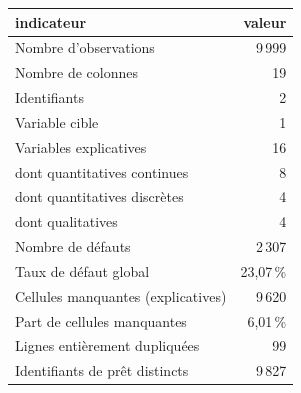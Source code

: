 \begin{tabular}{lr}
\toprule
\textbf{indicateur} & \textbf{valeur} \\
\midrule
Nombre d'observations & 9\,999 \\
Nombre de colonnes & 19 \\
Identifiants & 2 \\
Variable cible & 1 \\
Variables explicatives & 16 \\
dont quantitatives continues & 8 \\
dont quantitatives discrètes & 4 \\
dont qualitatives & 4 \\
Nombre de défauts & 2\,307 \\
Taux de défaut global & 23,07\,\% \\
Cellules manquantes (explicatives) & 9\,620 \\
Part de cellules manquantes & 6,01\,\% \\
Lignes entièrement dupliquées & 99 \\
Identifiants de prêt distincts & 9\,827 \\
\bottomrule
\end{tabular}
